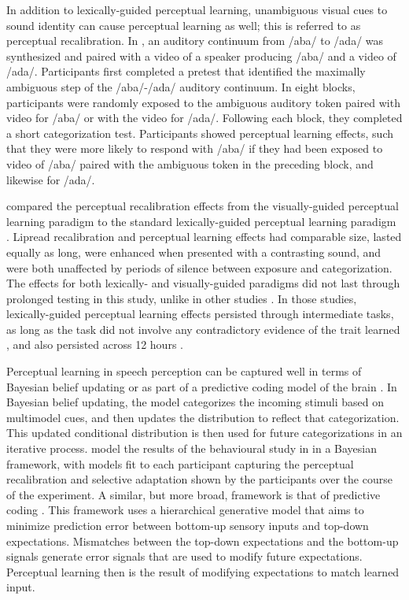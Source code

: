 In addition to lexically-guided perceptual learning, unambiguous visual cues to sound identity can cause perceptual learning as well; this is referred to as perceptual recalibration.
In \citet{Bertelson2003}, an auditory continuum from /aba/ to /ada/ was synthesized and paired with a video of a speaker producing /aba/ and a video of /ada/.  
Participants first completed a pretest that identified the maximally ambiguous step of the /aba/-/ada/ auditory continuum. 
In eight blocks, participants were randomly exposed to the ambiguous auditory token paired with video for /aba/ or with the video for /ada/.  Following each block, they completed a short categorization test.  
Participants showed perceptual learning effects, such that they were more likely to respond with /aba/ if they had been exposed to video of /aba/ paired with the ambiguous token in the preceding block, and likewise for /ada/.

\citet{vanLinden2007} compared the perceptual recalibration effects from the visually-guided perceptual learning paradigm \citep{Bertelson2003} to the standard lexically-guided perceptual learning paradigm \citep{Norris2003}.  
Lipread recalibration and perceptual learning effects had comparable size, lasted equally as long, were enhanced when presented with a contrasting sound, and were both unaffected by periods of silence between exposure and categorization.  
The effects for both lexically- and visually-guided paradigms did not last through prolonged testing in this study, unlike in other studies \citep{Kraljic2005,Eisner2006}.
In those studies, lexically-guided perceptual learning effects persisted through intermediate tasks, as long as the task did not involve any contradictory evidence of the trait learned \citep{Kraljic2005}, and also persisted across 12 hours \citep{Eisner2006}.

Perceptual learning in speech perception can be captured well in terms of Bayesian belief updating \citep{Kleinschmidt2011} or as part of a predictive coding model of the brain \citep{Clark2013}.  
In Bayesian belief updating, the model categorizes the incoming stimuli based on multimodel cues, and then updates the distribution to reflect that categorization.  
This updated conditional distribution is then used for future categorizations in an iterative process.  
\citet{Kleinschmidt2011} model the results of the behavioural study in \citet{Vroomen2007} in a Bayesian framework, with models fit to each participant capturing the perceptual recalibration and selective adaptation shown by the participants over the course of the experiment.  
A similar, but more broad, framework is that of predictive coding \citep{Clark2013}. 
This framework uses a hierarchical generative model that aims to minimize prediction error between bottom-up sensory inputs and top-down expectations.  
Mismatches between the top-down expectations and the bottom-up signals generate error signals that are used to modify future expectations.  
Perceptual learning then is the result of modifying expectations to match learned input.

